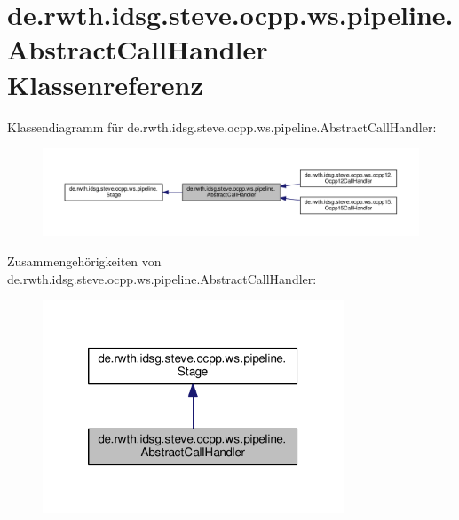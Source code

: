 \hypertarget{classde_1_1rwth_1_1idsg_1_1steve_1_1ocpp_1_1ws_1_1pipeline_1_1_abstract_call_handler}{\section{de.\-rwth.\-idsg.\-steve.\-ocpp.\-ws.\-pipeline.\-Abstract\-Call\-Handler Klassenreferenz}
\label{classde_1_1rwth_1_1idsg_1_1steve_1_1ocpp_1_1ws_1_1pipeline_1_1_abstract_call_handler}
}


Klassendiagramm für de.\-rwth.\-idsg.\-steve.\-ocpp.\-ws.\-pipeline.\-Abstract\-Call\-Handler\-:\nopagebreak
\begin{figure}[H]
\begin{center}
\leavevmode
\includegraphics[width=350pt]{classde_1_1rwth_1_1idsg_1_1steve_1_1ocpp_1_1ws_1_1pipeline_1_1_abstract_call_handler__inherit__graph}
\end{center}
\end{figure}


Zusammengehörigkeiten von de.\-rwth.\-idsg.\-steve.\-ocpp.\-ws.\-pipeline.\-Abstract\-Call\-Handler\-:\nopagebreak
\begin{figure}[H]
\begin{center}
\leavevmode
\includegraphics[width=254pt]{classde_1_1rwth_1_1idsg_1_1steve_1_1ocpp_1_1ws_1_1pipeline_1_1_abstract_call_handler__coll__graph}
\end{center}
\end{figure}
